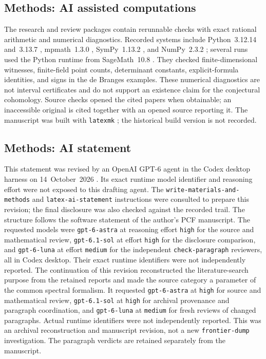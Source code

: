 \documentclass[11pt]{amsart}
\theoremstyle{plain}
\theoremstyle{definition}
\theoremstyle{remark}
\numberwithin{equation}{section}
\begin{document}
\subsection{Methods: AI assisted computations}
The research and review packages contain rerunnable checks with exact
rational arithmetic and numerical diagnostics. Recorded systems include
Python~3.12.14 and~3.13.7
\cite[\href{https://www.python.org/about/}{project description}]
{Python2026python}, mpmath~1.3.0
\cite[\href{https://mpmath.readthedocs.io/en/1.3.0/}{documentation}]
{Mpmath2026mpmath}, SymPy~1.13.2
\cite[\href{https://doi.org/10.7717/peerj-cs.103}{software description}]
{Meurer2017sympy}, and NumPy~2.3.2
\cite[pp.~357--362]{Harris2020array}; several runs used the Python
runtime from SageMath~10.8
\cite[\href{https://www.sagemath.org/}{project website}]{Sage2026sagemath}. They checked
finite-dimensional witnesses, finite-field point counts, determinant
constants, explicit-formula identities, and signs in the de Branges
examples. These numerical diagnostics are not interval certificates and
do not support an existence claim for the conjectural cohomology. Source
checks opened the cited papers when obtainable; an inaccessible original
is cited together with an opened source reporting it. The manuscript was
built with \nolinkurl{latexmk}
\cite[\href{https://ctan.org/pkg/latexmk}{package description}]
{Collins2026latexmk}; the historical build version is not recorded.

\subsection{Methods: AI statement}
This statement was revised by an OpenAI GPT-6 agent in the Codex desktop
harness on 14~October~2026
\cite[\href{https://openai.com/codex/}{product description}]{OpenAICodex}.
Its exact runtime model identifier and reasoning effort were not exposed
to this drafting agent. The \nolinkurl{write-materials-and-methods} and
\nolinkurl{latex-ai-statement} instructions were consulted to prepare this
revision; the final disclosure was also checked against the recorded trail.
The structure follows the software statement of the author's PCF manuscript.
The requested models were \nolinkurl{gpt-6-astra} at reasoning effort
\nolinkurl{high} for the source and mathematical review,
\nolinkurl{gpt-6.1-sol} at effort \nolinkurl{high} for the disclosure comparison,
and \nolinkurl{gpt-6-luna} at effort \nolinkurl{medium} for the independent
\nolinkurl{check-paragraph} reviewers, all in Codex desktop.
Their exact runtime identifiers were not independently reported.
The continuation of this revision reconstructed the literature-search
purpose from the retained reports and made the source category a
parameter of the common spectral formalism. It requested
\nolinkurl{gpt-6-astra} at \nolinkurl{high} for source and mathematical
review, \nolinkurl{gpt-6.1-sol} at \nolinkurl{high} for archival
provenance and paragraph coordination, and \nolinkurl{gpt-6-luna} at
\nolinkurl{medium} for fresh reviews of changed paragraphs. Actual
runtime identifiers were not independently reported. This was an
archival reconstruction and manuscript revision, not a new
\nolinkurl{frontier-dump} investigation. The paragraph verdicts are
retained separately from the manuscript.
\end{document}
